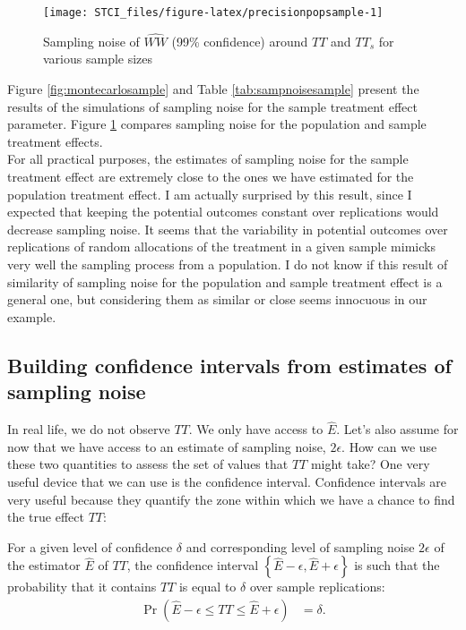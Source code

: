 \documentclass[]{book}
\theoremstyle{definition}
\theoremstyle{definition}
\theoremstyle{definition}
\theoremstyle{remark}
\let\BeginKnitrBlock\begin \let\EndKnitrBlock\end
\begin{document}
\begin{figure}[htbp]

{\centering \texttt{[image: STCI\_files/figure-latex/precisionpopsample-1]} 

}

\caption{Sampling noise of $\hat{WW}$ (99\% confidence) around $TT$ and $TT_s$ for various sample sizes}\label{fig:precisionpopsample}
\end{figure}

Figure \ref{fig:montecarlosample} and Table \ref{tab:sampnoisesample} present the results of the simulations of sampling noise for the sample treatment effect parameter.
Figure \ref{fig:precisionpopsample} compares sampling noise for the population and sample treatment effects.\\
For all practical purposes, the estimates of sampling noise for the sample treatment effect are extremely close to the ones we have estimated for the population treatment effect.
I am actually surprised by this result, since I expected that keeping the potential outcomes constant over replications would decrease sampling noise.
It seems that the variability in potential outcomes over replications of random allocations of the treatment in a given sample mimicks very well the sampling process from a population.
I do not know if this result of similarity of sampling noise for the population and sample treatment effect is a general one, but considering them as similar or close seems innocuous in our example.

\hypertarget{sec:confinterv}{%
\subsection{Building confidence intervals from estimates of sampling noise}\label{sec:confinterv}}

In real life, we do not observe \(TT\).
We only have access to \(\hat{E}\).
Let's also assume for now that we have access to an estimate of sampling noise, \(2\epsilon\).
How can we use these two quantities to assess the set of values that \(TT\) might take?
One very useful device that we can use is the confidence interval.
Confidence intervals are very useful because they quantify the zone within which we have a chance to find the true effect \(TT\):

\BeginKnitrBlock{theorem}[Confidence interval]
\protect\hypertarget{thm:confinter}{}{\label{thm:confinter} \iffalse (Confidence interval) \fi{} }For a given level of confidence \(\delta\) and corresponding level of sampling noise \(2\epsilon\) of the estimator \(\hat{E}\) of \(TT\), the confidence interval \(\left\{\hat{E}-\epsilon,\hat{E}+\epsilon\right\}\) is such that the probability that it contains \(TT\) is equal to \(\delta\) over sample replications:
\begin{align*}
  \Pr(\hat{E}-\epsilon\leq TT\leq\hat{E}+\epsilon) & = \delta.
\end{align*}
\EndKnitrBlock{theorem}
\end{document}
